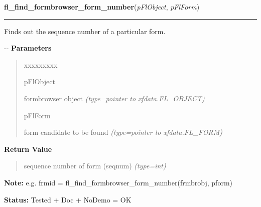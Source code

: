 \hspace{.8\funcindent}\begin{boxedminipage}{\funcwidth}

    \raggedright \textbf{fl\_find\_formbrowser\_form\_number}(\textit{pFlObject}, \textit{pFlForm})

    \vspace{-1.5ex}

    \rule{\textwidth}{0.5\fboxrule}
\setlength{\parskip}{2ex}

Finds out the sequence number of a particular form.

-{}-
\setlength{\parskip}{1ex}
      \textbf{Parameters}
      \vspace{-1ex}

      \begin{quote}
        \begin{Ventry}{xxxxxxxxx}

          \item[pFlObject]


formbrowser object
            {\it (type=pointer to xfdata.FL\_OBJECT)}

          \item[pFlForm]


form candidate to be found
            {\it (type=pointer to xfdata.FL\_FORM)}

        \end{Ventry}

      \end{quote}

      \textbf{Return Value}
    \vspace{-1ex}

      \begin{quote}

sequence number of form (seqnum)
      {\it (type=int)}

      \end{quote}

\textbf{Note:} 
e.g. frmid = fl\_find\_formbrowser\_form\_number(frmbrobj, pform)


\textbf{Status:} 
Tested + Doc + NoDemo = OK


    \end{boxedminipage}

    \label{xformslib:flformbrowser:fl_add_formbrowser}

    \vspace{0.5ex}

